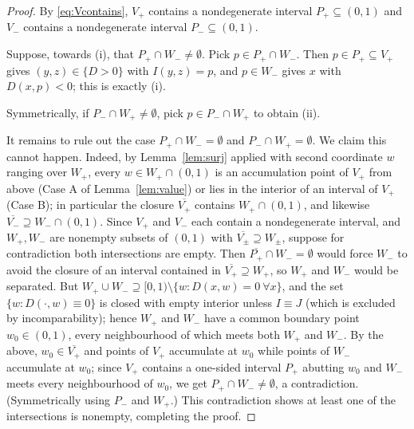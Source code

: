 \documentclass{amsart}
\theoremstyle{plain}
\theoremstyle{definition}
\begin{document}
\begin{proof}
By \eqref{eq:Vcontains}, $V_+$ contains a nondegenerate interval $P_+\subseteq(0,1)$ and
$V_-$ contains a nondegenerate interval $P_-\subseteq(0,1)$.

Suppose, towards (i), that $P_+\cap W_-\ne\emptyset$. Pick $p\in P_+\cap W_-$. Then
$p\in P_+\subseteq V_+$ gives $(y,z)\in\{D>0\}$ with $I(y,z)=p$, and $p\in W_-$ gives $x$
with $D(x,p)<0$; this is exactly (i).

Symmetrically, if $P_-\cap W_+\ne\emptyset$, pick $p\in P_-\cap W_+$ to obtain (ii).

It remains to rule out the case $P_+\cap W_-=\emptyset$ and $P_-\cap W_+=\emptyset$.
We claim this cannot happen. Indeed, by Lemma~\ref{lem:surj} applied with second
coordinate $w$ ranging over $W_+$, every $w\in W_+\cap(0,1)$ is an accumulation point of
$V_+$ from above (Case A of Lemma~\ref{lem:value}) or lies in the interior of an interval
of $V_+$ (Case B); in particular the closure $\overline{V_+}$ contains $W_+\cap(0,1)$, and
likewise $\overline{V_-}\supseteq W_-\cap(0,1)$. Since $V_+$ and $V_-$ each contain a
nondegenerate interval, and $W_+,W_-$ are nonempty subsets of $(0,1)$ with
$\overline{V_\pm}\supseteq W_\pm$, suppose for contradiction both intersections are empty.
Then $\overline{P_+}\cap W_-=\emptyset$ would force $W_-$ to avoid the closure of an
interval contained in $\overline{V_+}\supseteq W_+$, so $W_+$ and $W_-$ would be separated.
But $W_+\cup W_-\supseteq[0,1)\setminus\{w:D(x,w)=0\ \forall x\}$, and the set
$\{w:D(\cdot,w)\equiv0\}$ is closed with empty interior unless $I\equiv J$ (which is
excluded by incomparability); hence $W_+$ and $W_-$ have a common boundary point
$w_0\in(0,1)$, every neighbourhood of which meets both $W_+$ and $W_-$. By the above,
$w_0\in\overline{V_+}$ and points of $V_+$ accumulate at $w_0$ while points of $W_-$
accumulate at $w_0$; since $V_+$ contains a one-sided interval $P_+$ abutting $w_0$ and
$W_-$ meets every neighbourhood of $w_0$, we get $P_+\cap W_-\ne\emptyset$, a
contradiction. (Symmetrically using $P_-$ and $W_+$.) This contradiction shows at least
one of the intersections is nonempty, completing the proof.
\end{proof}
\end{document}
